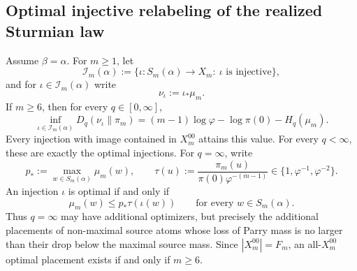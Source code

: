 \subsection{Optimal injective relabeling of the realized Sturmian law}

\begin{theorem}
\label{thm:optimal-injective-relabeling}
Assume \(\beta=\alpha\). For \(m\ge1\), let
\[
\mathcal I_m(\alpha):=
\{\iota:S_m(\alpha)\to X_m:\ \iota\text{ is injective}\},
\]
and for \(\iota\in\mathcal I_m(\alpha)\) write
\[
\nu_\iota:=\iota_*\mu_m.
\]
If \(m\ge6\), then for every \(q\in[0,\infty]\),
\[
\inf_{\iota\in\mathcal I_m(\alpha)}D_q(\nu_\iota\|\pi_m)
=
(m-1)\log\varphi-\log\pi(0)-H_q(\mu_m).
\]
Every injection with image contained in \(X_m^{00}\) attains this value. For
every \(q<\infty\), these are exactly the optimal injections. For
\(q=\infty\), write
\[
p_*:=\max_{w\in S_m(\alpha)}\mu_m(w),\qquad
\tau(u):=\frac{\pi_m(u)}{\pi(0)\varphi^{-(m-1)}}\in\{1,\varphi^{-1},\varphi^{-2}\}.
\]
An injection \(\iota\) is optimal if and only if
\[
\mu_m(w)\le p_*\tau(\iota(w))
\qquad\text{for every }w\in S_m(\alpha).
\]
Thus \(q=\infty\) may have additional optimizers, but precisely the additional
placements of non-maximal source atoms whose loss of Parry mass is no larger
than their drop below the maximal source mass. Since \(|X_m^{00}|=F_m\), an
all-\(X_m^{00}\) optimal placement exists if and only if \(m\ge6\).
\end{theorem}

